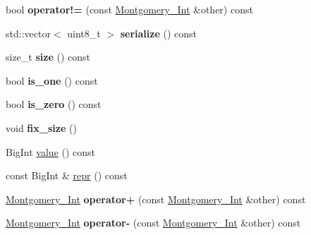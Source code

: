 \begin{DoxyCompactItemize}
bool {\bfseries operator!=} (const \mbox{\hyperlink{class_botan_1_1_montgomery___int}{Montgomery\+\_\+\+Int}} \&other) const
\item 
\mbox{\label{class_botan_1_1_montgomery___int_afca0ea19b95daf8a19736a4b4c2c58c3}} 
std\+::vector$<$ uint8\+\_\+t $>$ {\bfseries serialize} () const
\item 
\mbox{\label{class_botan_1_1_montgomery___int_a002611dc606e5d53039cfa226caf2943}} 
size\+\_\+t {\bfseries size} () const
\item 
\mbox{\label{class_botan_1_1_montgomery___int_a200e8ecefbef821238f9d63de1ad9855}} 
bool {\bfseries is\+\_\+one} () const
\item 
\mbox{\label{class_botan_1_1_montgomery___int_aba7ec7ab30218104ab17bc974f7c937a}} 
bool {\bfseries is\+\_\+zero} () const
\item 
\mbox{\label{class_botan_1_1_montgomery___int_adb46d0efcf60137e59fafb14e8ce5b6e}} 
void {\bfseries fix\+\_\+size} ()
\item 
Big\+Int \mbox{\hyperlink{class_botan_1_1_montgomery___int_abc91331bc32dc00db87e8343f9839709}{value}} () const
\item 
const Big\+Int \& \mbox{\hyperlink{class_botan_1_1_montgomery___int_aad869bdd9eb0dd780774f430169d9af1}{repr}} () const
\item 
\mbox{\label{class_botan_1_1_montgomery___int_ab59516fcf6e6d4b2dc029163ab726a8d}} 
\mbox{\hyperlink{class_botan_1_1_montgomery___int}{Montgomery\+\_\+\+Int}} {\bfseries operator+} (const \mbox{\hyperlink{class_botan_1_1_montgomery___int}{Montgomery\+\_\+\+Int}} \&other) const
\item 
\mbox{\label{class_botan_1_1_montgomery___int_aa135402ce9758b98c7296c986dcbe7e2}} 
\mbox{\hyperlink{class_botan_1_1_montgomery___int}{Montgomery\+\_\+\+Int}} {\bfseries operator-\/} (const \mbox{\hyperlink{class_botan_1_1_montgomery___int}{Montgomery\+\_\+\+Int}} \&other) const
\item 
\mbox{\label{class_botan_1_1_montgomery___int_a37fe70943374e7945bb02677d4d6c4c9}} 

\end{DoxyCompactItemize}
